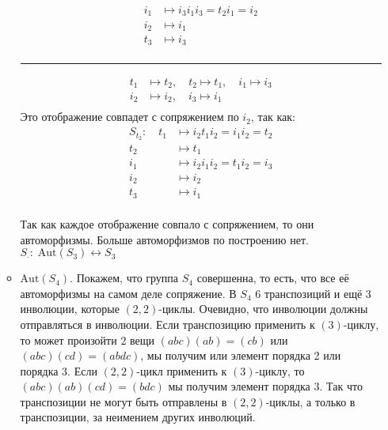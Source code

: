 \documentclass{article}
\begin{document}
\begin{enumerate}
\begin{itemize}
\begin{align*}
                    i_1&\mapsto i_3i_1i_3 = t_2i_1 = i_2\\
                    i_2&\mapsto i_1\\
                    t_3&\mapsto i_3\\
                \end{align*}
                \hrule
                \vspace{2ex}
                \begin{align*}
                    t_1&\mapsto t_2,\quad t_2\mapsto t_1,\quad i_1\mapsto i_3\\
                    i_2&\mapsto i_2,\quad i_3\mapsto i_1\\
                \end{align*}
                Это отображение совпадет с сопряжением по $i_2$, так как:
                \begin{align*}
                    S_{t_2}:\quad t_1&\mapsto i_2t_1i_2=i_1i_2=t_2\\
                    t_2&\mapsto t_1\\
                    i_1&\mapsto i_2i_1i_2 = t_1i_2 = i_3\\
                    i_2&\mapsto i_2\\
                    t_3&\mapsto i_1\\
                \end{align*}

                Так как каждое отображение совпало с сопряжением, то они автоморфизмы.
                Больше автоморфизмов по построению нет. $S_\cdot:\;\text{Aut}
                (S_3)\longleftrightarrow S_3$

            \item $\text{Aut}(S_4)$. Покажем, что группа $S_4$ совершенна, то
                есть, что все её автоморфизмы на самом деле сопряжение. В $S_4$
                6 транспозиций и ещё 3 инволюции, которые $(2,2)$-циклы. Очевидно,
                что инволюции должны отправляться в инволюции. Если
                транспозицию применить к $(3)$-циклу, то может произойти 2
                вещи $(abc)(ab) = (cb)$ или $(abc)(cd)=(abdc)$, мы получим или
                элемент порядка 2 или порядка 3. Если $(2,2)$-цикл применить к
                $(3)$-циклу, то $(abc)(ab)(cd)=(bdc)$ мы получим элемент порядка 3.
                Так что транспозиции не могут быть отправлены в $(2,2)$-циклы,
                а только в транспозиции, за неимением других инволюций.


\end{itemize}
\end{enumerate}
\end{document}
